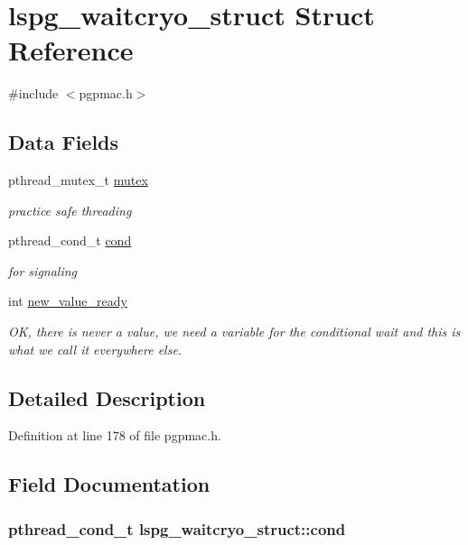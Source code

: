 \hypertarget{structlspg__waitcryo__struct}{\section{lspg\-\_\-waitcryo\-\_\-struct Struct Reference}
\label{structlspg__waitcryo__struct}
}


{\ttfamily \#include $<$pgpmac.\-h$>$}

\subsection*{Data Fields}
\begin{DoxyCompactItemize}
\item 
pthread\-\_\-mutex\-\_\-t \hyperlink{structlspg__waitcryo__struct_a62b50ead380fc8a6be35956eba384ba6}{mutex}
\begin{DoxyCompactList}\small\item\em practice safe threading \end{DoxyCompactList}\item 
pthread\-\_\-cond\-\_\-t \hyperlink{structlspg__waitcryo__struct_a54c275159d9f096e0d1884e64d099298}{cond}
\begin{DoxyCompactList}\small\item\em for signaling \end{DoxyCompactList}\item 
int \hyperlink{structlspg__waitcryo__struct_a97298b773fd8c1f2ef20159093a08246}{new\-\_\-value\-\_\-ready}
\begin{DoxyCompactList}\small\item\em O\-K, there is never a value, we need a variable for the conditional wait and this is what we call it everywhere else. \end{DoxyCompactList}\end{DoxyCompactItemize}


\subsection{Detailed Description}


Definition at line 178 of file pgpmac.\-h.



\subsection{Field Documentation}
\hypertarget{structlspg__waitcryo__struct_a54c275159d9f096e0d1884e64d099298}{
\subsubsection[{cond}]{\setlength{\rightskip}{0pt plus 5cm}pthread\-\_\-cond\-\_\-t lspg\-\_\-waitcryo\-\_\-struct\-::cond}}\label{structlspg__waitcryo__struct_a54c275159d9f096e0d1884e64d099298}


